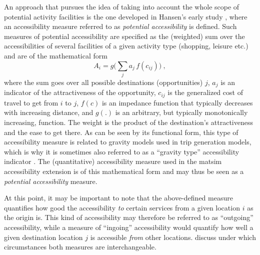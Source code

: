 An approach that pursues the idea of taking into account the whole scope of potential activity facilities is the one 
developed in Hansen's early study \citep{Hansen1959}, where an accessibility 
measure referred to as \textit{potential accessibility} is defined. Such measures of potential accessibility are 
specified as the (weighted) sum over the 
accessibilities of several facilities of a given activity type (\eg shopping, leisure etc.) and are of the mathematical form
\begin{equation}
	A_i = g\Big( \sum_j a_j \, f(c_{ij}) \Big) \ ,
	\label{eq:accessibility:basic}
\end{equation}
where the sum goes over all possible destinations (opportunities) $j$, $a_j$ is an indicator of the attractiveness of 
the opportunity, $c_{ij}$ is the generalized cost of travel to get from $i$ to $j$, $f(c)$ is an impedance function that 
typically decreases with increasing distance, and $g(.)$ is an arbitrary, but typically monotonically increasing, function. 
The weight is the product of the destination's attractiveness and the ease to get there. As can be seen by its functional form, 
this type of accessibility measure is related to gravity models used in trip generation models, which is why it is sometimes also
referred to as a “gravity type” accessibility indicator \citep{MorrisEtAl1978AccessibilityIndicators}.
The (quantitative) accessibility measure used in the \gls{matsim} accessibility extension is of this mathematical form
and may thus be seen as a \textit{potential accessibility} measure.


At this point, it may be important to note that the above-defined measure quantifies how good the accessibility \textit{to} 
certain services from a given location $i$ as the origin is. This kind of accessibility may therefore be referred to 
as ``outgoing'' accessibility, while a measure of ``ingoing'' accessibility would quantify how well a given destination 
location $j$ is accessible \textit{from} other locations. \citet{NicolaiNagel2012HiResAccessibilityMethodInBook} 
discuss under which circumstances both measures are interchangeable.

